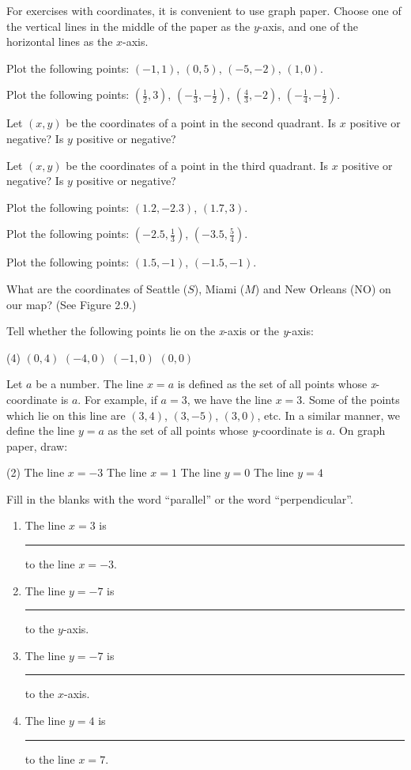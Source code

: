 \documentclass[12pt]{book} %
\begin{document}
\begin{ExerciseList}
	\Exercise For exercises with coordinates, it is convenient to use graph paper. Choose one of the vertical lines in the middle of the paper as the $y$-axis, and one of the horizontal lines as the $x$-axis.
	
	\Exercise Plot the following points: $(-1,1)$, $(0,5)$, $(-5,-2)$, $(1,0)$.
	
	\Exercise Plot the following points: $\left(\frac12,3\right)$, $\left(-\frac13,-\frac12\right)$, $\left(\frac43,-2\right)$, $\left(-\frac14,-\frac12\right)$.
	
	\Exercise Let $(x,y)$ be the coordinates of a point in the second quadrant. Is $x$ positive or negative? Is $y$ positive or negative?
	
	\Exercise Let $(x,y)$ be the coordinates of a point in the third quadrant. Is $x$ positive or negative? Is $y$ positive or negative?
	
	\Exercise Plot the following points: $(1.2,-2.3)$, $(1.7,3)$.
	
	\Exercise Plot the following points: $\left(-2.5,\frac13\right)$, $\left(-3.5,\frac54\right)$.
	
	\Exercise Plot the following points: $(1.5,-1)$, $(-1.5,-1)$.
	
	\Exercise What are the coordinates of Seattle ($S$), Miami ($M$) and New Orleans (NO) on our map? (See Figure 2.9.)
	
	\Exercise Tell whether the following points lie on the \textit{x}-axis or the \textit{y}-axis:
	\begin{tasks}(4)
		\task[(a)] $(0,4)$
		\task[(b)] $(-4,0)$
		\task[(c)] $(-1,0)$
		\task[(d)] $(0,0)$
	\end{tasks}
	
	\Exercise Let $a$ be a number. The line $x=a$ is defined as the set of all points whose \textit{x}-coordinate is $a$. For example, if $a=3$, we have the line $x=3$. Some of the points which lie on this line are $(3,4)$, $(3,-5)$, $(3,0)$, etc. In a similar manner, we define the line $y=a$ as the set of all points whose \textit{y}-coordinate is $a$. On graph paper, draw:
	\begin{tasks}(2)
		\task[(a)] The line $x=-3$
		\task[(b)] The line $x=1$
		\task[(c)] The line $y=0$
		\task[(d)] The line $y=4$
	\end{tasks}
	
	\Exercise Fill in the blanks with the word ``parallel'' or the word ``perpendicular''.
	\begin{enumerate}
		\item[(a)] The line $x=3$ is \rule{3cm}{0.4pt} to the line $x=-3$.
		\item[(b)] The line $y=-7$ is \rule{3cm}{0.4pt} to the $y$-axis.
		\item[(c)] The line $y=-7$ is \rule{3cm}{0.4pt} to the $x$-axis.
		\item[(d)] The line $y=4$ is \rule{3cm}{0.4pt} to the line $x=7$.
	\end{enumerate}
	

\end{ExerciseList}
\end{document}

